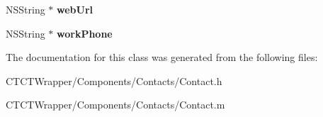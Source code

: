 \begin{DoxyCompactItemize}
\item 
\hypertarget{interface_contact_ad2275fe6835463f421659f914e5562ed}{N\-S\-String $\ast$ {\bfseries web\-Url}}\label{interface_contact_ad2275fe6835463f421659f914e5562ed}

\item 
\hypertarget{interface_contact_a76be4721aa8c7eab59a9aad7a34d4986}{N\-S\-String $\ast$ {\bfseries work\-Phone}}\label{interface_contact_a76be4721aa8c7eab59a9aad7a34d4986}

\end{DoxyCompactItemize}


The documentation for this class was generated from the following files\-:\begin{DoxyCompactItemize}
\item 
C\-T\-C\-T\-Wrapper/\-Components/\-Contacts/Contact.\-h\item 
C\-T\-C\-T\-Wrapper/\-Components/\-Contacts/Contact.\-m\end{DoxyCompactItemize}

